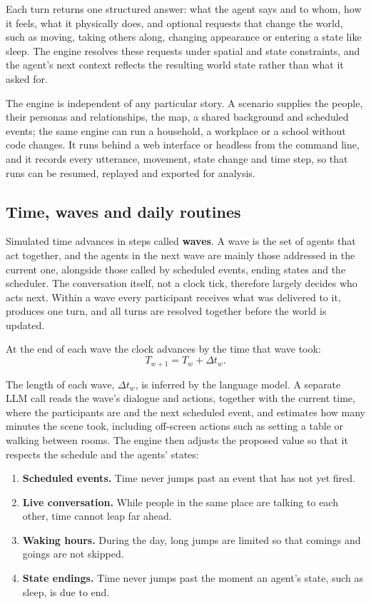 Each turn returns one structured answer: what the agent says and to whom, how it feels, what it physically does, and optional requests that change the world, such as moving, taking others along, changing appearance or entering a state like sleep. The engine resolves these requests under spatial and state constraints, and the agent's next context reflects the resulting world state rather than what it asked for.

The engine is independent of any particular story. A scenario supplies the people, their personas and relationships, the map, a shared background and scheduled events; the same engine can run a household, a workplace or a school without code changes. It runs behind a web interface or headless from the command line, and it records every utterance, movement, state change and time step, so that runs can be resumed, replayed and exported for analysis.

\subsection{Time, waves and daily routines}
\label{sec:methods:time}

Simulated time advances in steps called \textbf{waves}. A wave is the set of agents that act together, and the agents in the next wave are mainly those addressed in the current one, alongside those called by scheduled events, ending states and the scheduler. The conversation itself, not a clock tick, therefore largely decides who acts next. Within a wave every participant receives what was delivered to it, produces one turn, and all turns are resolved together before the world is updated.

At the end of each wave the clock advances by the time that wave took:
\begin{equation}
  T_{w+1} = T_w + \Delta t_w .
  \label{eq:methods:clock}
\end{equation}

The length of each wave, $\Delta t_w$, is inferred by the language model. A separate LLM call reads the wave's dialogue and actions, together with the current time, where the participants are and the next scheduled event, and estimates how many minutes the scene took, including off-screen actions such as setting a table or walking between rooms. The engine then adjusts the proposed value so that it respects the schedule and the agents' states:
\begin{enumerate}
  \item \textbf{Scheduled events.} Time never jumps past an event that has not yet fired.
  \item \textbf{Live conversation.} While people in the same place are talking to each other, time cannot leap far ahead.
  \item \textbf{Waking hours.} During the day, long jumps are limited so that comings and goings are not skipped.
  \item \textbf{State endings.} Time never jumps past the moment an agent's state, such as sleep, is due to end.
\end{enumerate}

